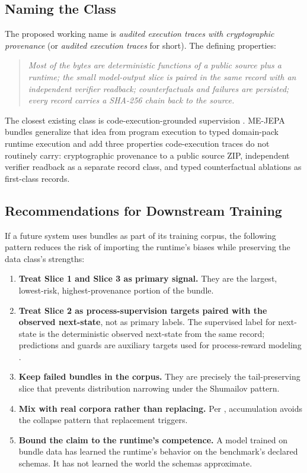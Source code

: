 \documentclass[10pt,twocolumn,letterpaper]{article}
\begin{document}
\subsection{Naming the Class}

The proposed working name is \emph{audited execution traces with
cryptographic provenance} (or \emph{audited execution traces} for
short). The defining properties:
\begin{quote}\itshape
Most of the bytes are deterministic functions of a public source
plus a runtime; the small model-output slice is paired in the same
record with an independent verifier readback; counterfactuals and
failures are persisted; every record carries a SHA-256 chain back
to the source.
\end{quote}
The closest existing class is code-execution-grounded supervision
\citep{jung2025codeexec}. ME-JEPA bundles generalize that idea from
program execution to typed domain-pack runtime execution and add
three properties code-execution traces do not routinely carry:
cryptographic provenance to a public source ZIP, independent
verifier readback as a separate record class, and typed
counterfactual ablations as first-class records.

\subsection{Recommendations for Downstream Training}

If a future system uses bundles as part of its training corpus, the
following pattern reduces the risk of importing the runtime's
biases while preserving the data class's strengths:

\begin{enumerate}[leftmargin=1.2em]
\item \textbf{Treat Slice 1 and Slice 3 as primary signal.} They
      are the largest, lowest-risk, highest-provenance portion of
      the bundle.
\item \textbf{Treat Slice 2 as process-supervision targets paired
      with the observed next-state}, not as primary labels. The
      supervised label for next-state is the deterministic observed
      next-state from the same record; predictions and guards are
      auxiliary targets used for process-reward modeling
      \citep{lightman2023verify}.
\item \textbf{Keep failed bundles in the corpus.} They are
      precisely the tail-preserving slice that prevents
      distribution narrowing under the Shumailov pattern.
\item \textbf{Mix with real corpora rather than replacing.} Per
      \citep{gerstgrasser2024accumulate}, accumulation avoids the
      collapse pattern that replacement triggers.
\item \textbf{Bound the claim to the runtime's competence.} A model
      trained on bundle data has learned the runtime's behavior on
      the benchmark's declared schemas. It has not learned the
      world the schemas approximate.
\end{enumerate}
\end{document}
